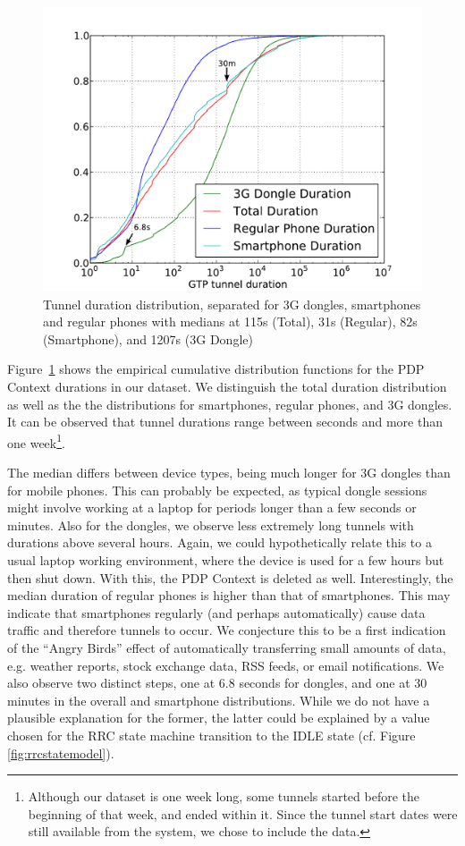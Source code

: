 \begin{figure}
	\centering
	\includegraphics[width=\columnwidth]{images/CONEXT2012/tunnel-dur-class-cdf-mod.pdf}
	\caption{Tunnel duration distribution, separated for 3G dongles, smartphones and regular phones with medians at 115s (Total), 31s (Regular), 82s (Smartphone), and 1207s (3G Dongle)}
	\label{fig:cdf-duration-device-class-CONEXT}
\end{figure}

Figure~\ref{fig:cdf-duration-device-class-CONEXT} shows the empirical cumulative distribution functions for the PDP Context durations in our dataset. We distinguish the total duration distribution as well as the the distributions for smartphones, regular phones, and 3G dongles. It can be observed that tunnel durations range between  seconds and more than one week\footnote{Although our dataset is one week long, some tunnels started before the beginning of that week, and ended within it. Since the tunnel start dates were still available from the system, we chose to include the data.}.

The median differs between device types, being much longer for 3G dongles than for mobile phones. This can probably be expected, as typical dongle sessions might involve working at a laptop for periods longer than a few seconds or minutes. Also for the dongles, we observe less extremely long tunnels with durations above several hours. Again, we could hypothetically relate this to a usual laptop working environment, where the device is used for a few hours but then shut down. With this, the PDP Context is deleted as well. Interestingly, the median duration of regular phones is higher than that of smartphones. This may indicate that  smartphones regularly (and perhaps automatically) cause data traffic and therefore tunnels to occur. We conjecture this to be a first indication of the ``Angry Birds'' effect of automatically transferring small amounts of data, e.g. weather reports, stock exchange data, RSS feeds, or email notifications. We also observe two distinct steps, one at 6.8 seconds for dongles, and one at 30 minutes in the overall and smartphone distributions. While we do not have a plausible explanation for the former, the latter could be explained by a value chosen for the RRC state machine transition to the IDLE state (cf. Figure \ref{fig:rrcstatemodel}).


